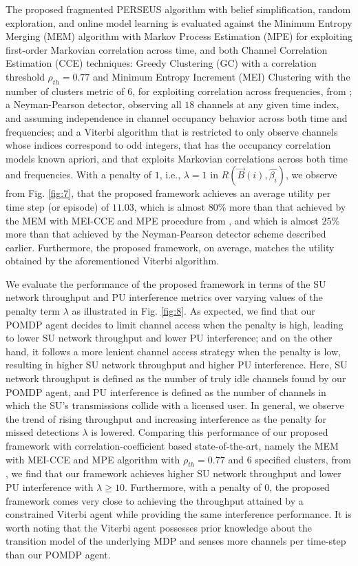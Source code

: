 \documentclass[10pt,twocolumn]{IEEEtran}
\begin{document}
The proposed fragmented PERSEUS algorithm with belief simplification, random exploration, and online model learning is evaluated against the Minimum Entropy Merging (MEM) algorithm with Markov Process Estimation (MPE) for exploiting first-order Markovian correlation across time, and both Channel Correlation Estimation (CCE) techniques: Greedy Clustering (GC) with a correlation threshold $\rho_{th}{=}0.77$ and Minimum Entropy Increment (MEI) Clustering with the number of clusters metric of $6$, for exploiting correlation across frequencies, from \cite{6956794}; a Neyman-Pearson detector, observing all $18$ channels at any given time index, and assuming independence in channel occupancy behavior across both time and frequencies; and a Viterbi algorithm that is restricted to only observe channels whose indices correspond to odd integers, that has the occupancy correlation models known apriori, and that exploits Markovian correlations across both time and frequencies. With a penalty of $1$, i.e., $\lambda{=}1$ in $R(\vec{B}(i),\hat{\beta_{i}})$, we observe from Fig. \ref{fig:7}, that the proposed framework achieves an average utility per time step (or episode) of $11.03$, which is almost $80$\% more than that achieved by the MEM with MEI-CCE and MPE procedure from \cite{6956794}, and which is almost $25$\% more than that achieved by the Neyman-Pearson detector scheme described earlier. Furthermore, the proposed framework, on average, matches the utility obtained by the aforementioned Viterbi algorithm.

We evaluate the performance of the proposed framework in terms of the SU network throughput and PU interference metrics over varying values of the penalty term $\lambda$ as illustrated in Fig. \ref{fig:8}. As expected, we find that our POMDP agent decides to limit channel access when the penalty is high, leading to lower SU network throughput and lower PU interference; and on the other hand, it follows a more lenient channel access strategy when the penalty is low, resulting in higher SU network throughput and higher PU interference. Here, SU network throughput is defined as the number of truly idle channels found by our POMDP agent, and PU interference is defined as the number of channels in which the SU's transmissions collide with a licensed user. In general, we observe the trend of rising throughput and increasing interference as the penalty for missed detections $\lambda$ is lowered. Comparing this performance of our proposed framework with correlation-coefficient based state-of-the-art, namely the MEM with MEI-CCE and MPE algorithm with $\rho_{th}{=}0.77$ and $6$ specified clusters, from \cite{6956794}, we find that our framework achieves higher SU network throughput and lower PU interference with $\lambda{\geq}10$. Furthermore, with a penalty of $0$, the proposed framework comes very close to achieving the throughput attained by a constrained Viterbi agent while providing the same interference performance. It is worth noting that the Viterbi agent possesses prior knowledge about the transition model of the underlying MDP and senses more channels per time-step than our POMDP agent.
\vspace{-2.5mm}
\end{document}
